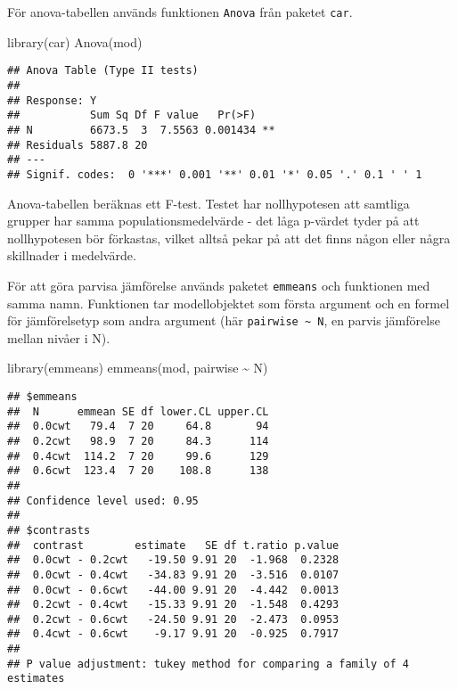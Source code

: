 \documentclass[
]{book}
\newenvironment{Shaded}{\begin{snugshade}}{\end{snugshade}}
\newcommand{\FunctionTok}[1]{\textcolor[rgb]{0.00,0.00,0.00}{#1}}
\newcommand{\NormalTok}[1]{#1}
\newcommand{\SpecialCharTok}[1]{\textcolor[rgb]{0.00,0.00,0.00}{#1}}
\theoremstyle{definition}
\theoremstyle{definition}
\theoremstyle{definition}
\theoremstyle{definition}
\theoremstyle{remark}
\begin{document}
För anova-tabellen används funktionen \texttt{Anova} från paketet \texttt{car}.

\begin{Shaded}
\begin{Highlighting}[]
\FunctionTok{library}\NormalTok{(car)}
\FunctionTok{Anova}\NormalTok{(mod)}
\end{Highlighting}
\end{Shaded}

\begin{verbatim}
## Anova Table (Type II tests)
## 
## Response: Y
##           Sum Sq Df F value   Pr(>F)   
## N         6673.5  3  7.5563 0.001434 **
## Residuals 5887.8 20                    
## ---
## Signif. codes:  0 '***' 0.001 '**' 0.01 '*' 0.05 '.' 0.1 ' ' 1
\end{verbatim}

Anova-tabellen beräknas ett F-test. Testet har nollhypotesen att samtliga grupper har samma populationsmedelvärde - det låga p-värdet tyder på att nollhypotesen bör förkastas, vilket alltså pekar på att det finns någon eller några skillnader i medelvärde.

För att göra parvisa jämförelse används paketet \texttt{emmeans} och funktionen med samma namn. Funktionen tar modellobjektet som första argument och en formel för jämförelsetyp som andra argument (här \texttt{pairwise\ \textasciitilde{}\ N}, en parvis jämförelse mellan nivåer i N).

\begin{Shaded}
\begin{Highlighting}[]
\FunctionTok{library}\NormalTok{(emmeans)}
\FunctionTok{emmeans}\NormalTok{(mod, pairwise }\SpecialCharTok{\textasciitilde{}}\NormalTok{ N)}
\end{Highlighting}
\end{Shaded}

\begin{verbatim}
## $emmeans
##  N      emmean SE df lower.CL upper.CL
##  0.0cwt   79.4  7 20     64.8       94
##  0.2cwt   98.9  7 20     84.3      114
##  0.4cwt  114.2  7 20     99.6      129
##  0.6cwt  123.4  7 20    108.8      138
## 
## Confidence level used: 0.95 
## 
## $contrasts
##  contrast        estimate   SE df t.ratio p.value
##  0.0cwt - 0.2cwt   -19.50 9.91 20  -1.968  0.2328
##  0.0cwt - 0.4cwt   -34.83 9.91 20  -3.516  0.0107
##  0.0cwt - 0.6cwt   -44.00 9.91 20  -4.442  0.0013
##  0.2cwt - 0.4cwt   -15.33 9.91 20  -1.548  0.4293
##  0.2cwt - 0.6cwt   -24.50 9.91 20  -2.473  0.0953
##  0.4cwt - 0.6cwt    -9.17 9.91 20  -0.925  0.7917
## 
## P value adjustment: tukey method for comparing a family of 4 estimates
\end{verbatim}
\end{document}
